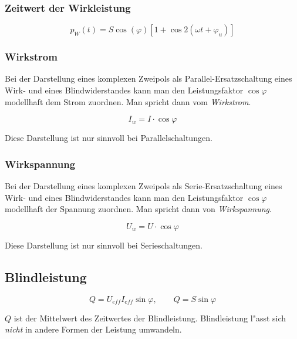 \documentclass[german, 10pt, a4paper, headsepline]{scrreprt}
\theoremstyle{remark}
\begin{document}
\subsubsection{Zeitwert der Wirkleistung}

\begin{displaymath}
	p_W(t) = S \cos(\varphi) [1+\cos 2(\omega t + \varphi_u)]
\end{displaymath}

\subsubsection{Wirkstrom}

Bei der Darstellung eines komplexen Zweipols als Parallel-Ersatzschaltung eines Wirk- und eines Blindwiderstandes kann man den Leistungsfaktor $\cos\varphi$ modellhaft dem Strom zuordnen. Man spricht dann vom \textit{Wirkstrom}.

\begin{displaymath}
	I_w = I \cdotp \cos \varphi
\end{displaymath}

Diese Darstellung ist nur sinnvoll bei Parallelschaltungen.

\subsubsection{Wirkspannung}

Bei der Darstellung eines komplexen Zweipols als Serie-Ersatzschaltung eines Wirk- und eines Blindwiderstandes kann man den Leistungsfaktor $\cos\varphi$ modellhaft der Spannung zuordnen. Man spricht dann von \textit{Wirkspannung}.

\begin{displaymath}
	U_w = U \cdotp \cos \varphi
\end{displaymath}

Diese Darstellung ist nur sinnvoll bei Serieschaltungen.

\subsection{Blindleistung}

\begin{displaymath}
	Q = U_{eff}I_{eff}\sin\varphi, \qquad Q = S \sin \varphi
\end{displaymath}

$Q$ ist der Mittelwert des Zeitwertes der Blindleistung. Blindleistung l"asst sich \textit{nicht} in andere Formen der Leistung umwandeln.
\end{document}
